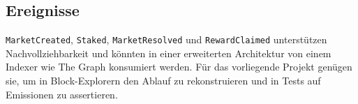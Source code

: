 \subsection{Ereignisse}

\texttt{MarketCreated}, \texttt{Staked}, \texttt{MarketResolved} und
\texttt{RewardClaimed} unterstützen Nachvollziehbarkeit und könnten in einer
erweiterten Architektur von einem Indexer wie The Graph konsumiert werden. Für
das vorliegende Projekt genügen sie, um in Block-Explorern den Ablauf zu
rekonstruieren und in Tests auf Emissionen zu assertieren.
